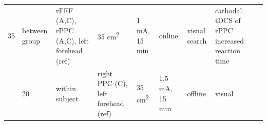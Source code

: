 \documentclass[11pt,english,]{memoir}
\begin{document}
\begin{longtable}[]{@{}lllllllll@{}}
\begin{minipage}[t]{0.03\columnwidth}
35\strut
\end{minipage} & \begin{minipage}[t]{0.05\columnwidth}\raggedright
between
group\strut
\end{minipage} & \begin{minipage}[t]{0.15\columnwidth}\raggedright
rFEF (A,C), rPPC (A,C), left
forehead (ref)\strut
\end{minipage} & \begin{minipage}[t]{0.04\columnwidth}\raggedright
35
cm\textsuperscript{2}\strut
\end{minipage} & \begin{minipage}[t]{0.06\columnwidth}\raggedright
1 mA, 15
min\strut
\end{minipage} & \begin{minipage}[t]{0.05\columnwidth}\raggedright
online\strut
\end{minipage} & \begin{minipage}[t]{0.06\columnwidth}\raggedright
visual
search\strut
\end{minipage} & \begin{minipage}[t]{0.25\columnwidth}\raggedright
cathodal tDCS of rPPC increased reaction time\strut
\end{minipage}\tabularnewline
\begin{minipage}[t]{0.08\columnwidth}\raggedright
\textcite{Ellison2014}\strut
\end{minipage} & \begin{minipage}[t]{0.03\columnwidth}\raggedright
20\strut
\end{minipage} & \begin{minipage}[t]{0.05\columnwidth}\raggedright
within
subject\strut
\end{minipage} & \begin{minipage}[t]{0.15\columnwidth}\raggedright
right PPC (C), left forehead
(ref)\strut
\end{minipage} & \begin{minipage}[t]{0.04\columnwidth}\raggedright
35
cm\textsuperscript{2}\strut
\end{minipage} & \begin{minipage}[t]{0.06\columnwidth}\raggedright
1.5 mA, 15
min\strut
\end{minipage} & \begin{minipage}[t]{0.05\columnwidth}\raggedright
offline\strut
\end{minipage} & \begin{minipage}[t]{0.06\columnwidth}\raggedright
visual

\end{minipage}
\end{longtable}
\end{document}
